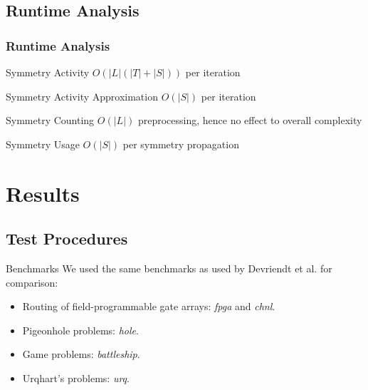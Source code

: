 \documentclass{beamer}
\begin{document}
	\subsection{Runtime Analysis}
	\begin{frame}
		\frametitle{Runtime Analysis}
		
		\begin{block}{Symmetry Activity}
			$O(|L|(|T| + |S|))$ per iteration
		\end{block}
		\begin{block}{Symmetry Activity Approximation}
			$O(|S|)$ per iteration
		\end{block}
		\begin{block}{Symmetry Counting}
			$O(|L|)$ preprocessing, hence no effect to overall complexity
		\end{block}
		\begin{block}{Symmetry Usage}
			$O(|S|)$ per symmetry propagation
		\end{block}
	\end{frame}

\section{Results}

	\subsection{Test Procedures}
	\begin{frame}
		\begin{block}{Benchmarks}
			We used the same benchmarks as used by Devriendt et al. for comparison:
			\begin{itemize}
				\item Routing of field-programmable gate arrays: \emph{fpga} and \emph{chnl}.
				\item Pigeonhole problems: \emph{hole}.
				\item Game problems: \emph{battleship}.
				\item Urqhart's problems: \emph{urq}.
			\end{itemize}
		\end{block}
	\end{frame}
	
\end{document}
